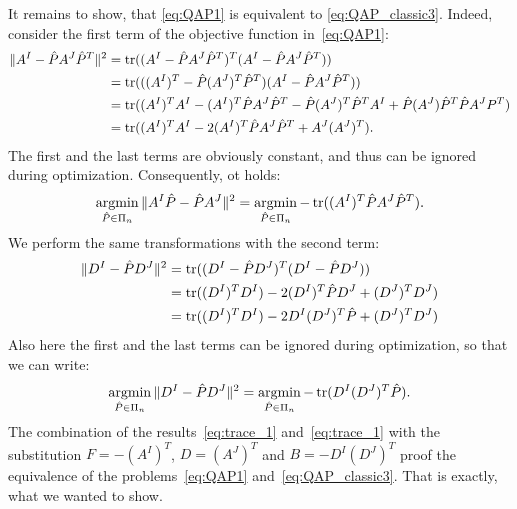 It remains to show, that \eqref{eq:QAP1} is equivalent to \eqref{eq:QAP_classic3}. Indeed, consider the first term of the objective function in~\eqref{eq:QAP1}:
\begin{align*}
\|A^I-\hat{P}A^J\hat{P}^T\|^2 &= \mathop{\rm tr}((A^I-\hat{P}A^J\hat{P}^T)^T(A^I-\hat{P}A^J\hat{P}^T)) \notag\\
							  &= \mathop{\rm tr}(((A^I)^T-\hat{P}(A^J)^T\hat{P}^T)(A^I-\hat{P}A^J\hat{P}^T)) \notag\\
							  &= \mathop{\rm tr}((A^I)^TA^I-(A^I)^T\hat{P}A^J\hat{P}^T-\hat{P}(A^J)^T\hat{P}^TA^I+\hat{P}(A^J)\hat{P}^T\hat{P}A^JP^T) \notag\\
							  &= \mathop{\rm tr}((A^I)^TA^I-2(A^I)^T\hat{P}A^J\hat{P}^T+A^J(A^J)^T).
\end{align*}
The first and the last terms are obviously constant, and thus can be ignored during optimization. Consequently, ot holds:
\begin{equation}\label{eq:trace_1}
\mathop{\rm argmin}_{\hat{P}\in\Pi_n}\|A^I\hat{P}-\hat{P}A^J\|^2 = \mathop{\rm argmin}_{\hat{P}\in\Pi_n}-\mathop{\rm tr}((A^I)^T\hat{P}A^J\hat{P}^T).
\end{equation}
We perform the same transformations with the second term:
\begin{align*}
\|D^I-\hat{P}D^J\|^2 &= \mathop{\rm tr}((D^I-\hat{P}D^J)^T(D^I-\hat{P}D^J)) \notag\\
					 &= \mathop{\rm tr}((D^I)^TD^I)-2(D^I)^T\hat{P}D^J+(D^J)^TD^J) \notag\\
					 &= \mathop{\rm tr}((D^I)^TD^I)-2D^I(D^J)^T\hat{P}+(D^J)^TD^J) 
\end{align*} 
Also here the first and the last terms can be ignored during optimization, so that we can write:
\begin{equation}\label{eq:trace_2}
\mathop{\rm argmin}_{\hat{P}\in\Pi_n}\|D^I-\hat{P}D^J\|^2=\mathop{\rm argmin}_{\hat{P}\in\Pi_n}-\mathop{\rm tr}(D^I(D^J)^T\hat{P}).
\end{equation}
The combination of the results~\eqref{eq:trace_1} and~\eqref{eq:trace_1} with the substitution $F=-(A^I)^T$, $D=(A^J)^T$ and $B=-D^I(D^J)^T$ proof the equivalence of the problems~\eqref{eq:QAP1} and~\eqref{eq:QAP_classic3}. That is exactly, what we wanted to show.



